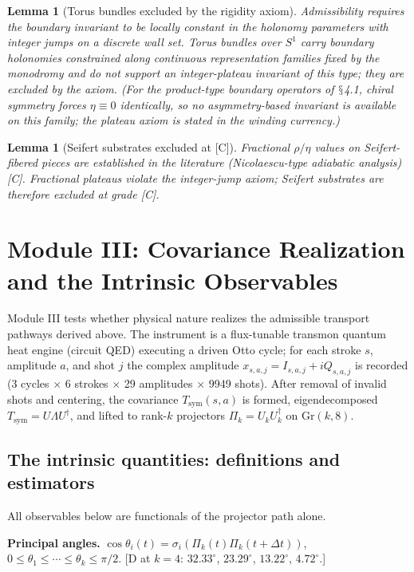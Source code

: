 \documentclass[11pt]{article}
\theoremstyle{definition}
\theoremstyle{plain}
\newtheorem{lemma}[definition]{Lemma}
\begin{document}
\begin{lemma}[Torus bundles excluded by the rigidity axiom]
Admissibility requires the boundary invariant to be locally constant in the
holonomy parameters with integer jumps on a discrete wall set. Torus bundles over
$S^1$ carry boundary holonomies constrained along continuous representation
families fixed by the monodromy and do not support an integer-plateau invariant of
this type; they are excluded by the axiom. (For the product-type boundary operators
of $\mathsection$4.1, chiral symmetry forces $\eta \equiv 0$ identically, so no
asymmetry-based invariant is available on this family; the plateau axiom is stated
in the winding currency.)
\end{lemma}

\begin{lemma}[Seifert substrates excluded at {[C]}]
Fractional $\rho/\eta$ values on Seifert-fibered pieces are established in the
literature (Nicolaescu-type adiabatic analysis) [C]. Fractional plateaus violate
the integer-jump axiom; Seifert substrates are therefore excluded at grade [C].
\end{lemma}

\section{Module III: Covariance Realization and the Intrinsic Observables}

Module III tests whether physical nature realizes the admissible transport pathways
derived above. The instrument is a flux-tunable transmon quantum heat engine
(circuit QED) executing a driven Otto cycle; for each stroke $s$, amplitude $a$,
and shot $j$ the complex amplitude $x_{s,a,j} = I_{s,a,j} + iQ_{s,a,j}$ is recorded
(3 cycles $\times$ 6 strokes $\times$ 29 amplitudes $\times$ 9949 shots). After
removal of invalid shots and centering, the covariance $T_{\mathrm{sym}}(s,a)$ is
formed, eigendecomposed $T_{\mathrm{sym}} = U\Lambda U^{\dagger}$, and lifted to
rank-$k$ projectors $\Pi_k = U_k U_k^{\dagger}$ on $\mathrm{Gr}(k,8)$.

\subsection{The intrinsic quantities: definitions and estimators}

All observables below are functionals of the projector path alone.

\textbf{Principal angles.} $\cos\theta_i(t) = \sigma_i(\Pi_k(t)\Pi_k(t+\Delta t))$,
$0 \le \theta_1 \le \cdots \le \theta_k \le \pi/2$.
[D at $k = 4$: $32.33^\circ$, $23.29^\circ$, $13.22^\circ$, $4.72^\circ$.]
\end{document}
